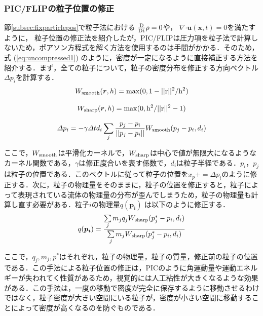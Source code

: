 \documentclass[a4j,12pt]{jreport}
\begin{document}
\subsubsection{PIC/FLIPの粒子位置の修正}\label{subsubsec:fixparticlepos}
節\ref{subsec:fixparticlepos}で粒子法における
$\frac{\rm{D}}{\rm{Dt}}\rho  = 0$や，
$\nabla\boldsymbol{\cdot}\bm{u} (\bm{x},t)  = 0$を満たすように，
粒子位置の修正法を紹介したが，PIC/FLIPは圧力項を粒子法で計算しないため，ポアソン方程式を解く方法を使用するのは手間がかかる．そのため，式 (\ref{eq:uncompressed1}) のように，密度が一定になるように直接補正する方法を紹介する．まず，全ての粒子について，粒子の密度分布を修正する方向ベクトル$\varDelta p_i$を計算する．
\begin{equation}\label{eq:w_smooth}
W_{\rm{smooth}} (\bm{r},h)  = \rm{max} (0,1-||r||^2/h^2) 
\end{equation} 

\begin{equation}\label{eq:w_sharp}
W_{\rm{sharp}} (\bm{r},h)  = \rm{max} (0,h^2/||r||^2 - 1) 
\end{equation} 

\begin{equation}\label{eq:fixVector}
\varDelta p_i = -\gamma \varDelta td_i\sum\limits_j \frac{p_j - p_i}{||p_j - p_i||}W_{\rm{smooth}} (p_j - p_i,d_i) 
\end{equation} 

ここで，$W_{\rm{smooth}}$は平滑化カーネルで，$W_{\rm{sharp}}$は中心で値が無限大になるようなカーネル関数である，$\gamma$は修正度合いを表す係数で，$d_i$は粒子半径である．$p_i$，$p_j$は粒子の位置である．このベクトルに従って粒子の位置を$x_p += \varDelta p_i$のように修正する．次に，粒子の物理量をそのままに，粒子の位置を修正すると，粒子によって表現されている流体の物理量の分布が歪んでしまうため，粒子の物理量も計算し直す必要がある．粒子$i$の物理量$q (\bm{p_i}) $ は以下のように修正する．
\begin{equation}\label{eq:fixVelocity}
q (\bm{p_i})  = \frac{\sum\limits_j m_jq_jW_{\rm{sharp}} (p^*_j - p_i,d_i) }{\sum\limits_j m_jW_{\rm{sharp}} (p^*_j - p_i,d_i) }
\end{equation} 

ここで，$q_j,m_j,p^*$はそれぞれ，粒子の物理量，粒子の質量，修正前の粒子の位置である．この手法による粒子位置の修正は，PICのように角運動量や運動エネルギーが失われてく性質があるため，視覚的には人工粘性が大きくなるような効果がある．この手法は，一度の移動で密度が完全に保存するように移動させるわけではなく，粒子密度が大きい空間にいる粒子が，密度が小さい空間に移動することによって密度が高くなるのを防ぐものである．
\end{document}
